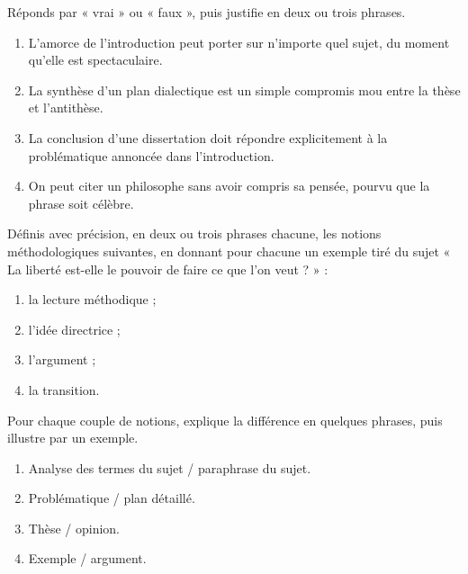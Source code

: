 \documentclass[11pt]{article}
\newcounter{popsec}
\newcounter{popsub}
\newcommand{\courssub}[1]{%
  \stepcounter{popsub}%
  \par\vspace{9pt}\noindent{\popxbold\fontsize{11.5}{13}\selectfont\color{popink}{\color{poporange}\thepopsec.\thepopsub}\hspace{6pt}#1}\par\nopagebreak\vspace{4pt}
}
\begin{document}
\begin{exercice}
Réponds par « vrai » ou « faux », puis justifie en deux ou trois phrases.

\begin{enumerate}
\item L'amorce de l'introduction peut porter sur n'importe quel sujet, du moment qu'elle est spectaculaire.
\item La synthèse d'un plan dialectique est un simple compromis mou entre la thèse et l'antithèse.
\item La conclusion d'une dissertation doit répondre explicitement à la problématique annoncée dans l'introduction.
\item On peut citer un philosophe sans avoir compris sa pensée, pourvu que la phrase soit célèbre.
\end{enumerate}
\end{exercice}

\begin{exercice}[Définitions]
Définis avec précision, en deux ou trois phrases chacune, les notions méthodologiques suivantes, en donnant pour chacune un exemple tiré du sujet « La liberté est-elle le pouvoir de faire ce que l'on veut ? » :

\begin{enumerate}
\item la lecture méthodique ;
\item l'idée directrice ;
\item l'argument ;
\item la transition.
\end{enumerate}
\end{exercice}

\begin{exercice}
Pour chaque couple de notions, explique la différence en quelques phrases, puis illustre par un exemple.

\begin{enumerate}
\item Analyse des termes du sujet / paraphrase du sujet.
\item Problématique / plan détaillé.
\item Thèse / opinion.
\item Exemple / argument.
\end{enumerate}
\end{exercice}

\courssub{Je m'entraîne}
\end{document}
